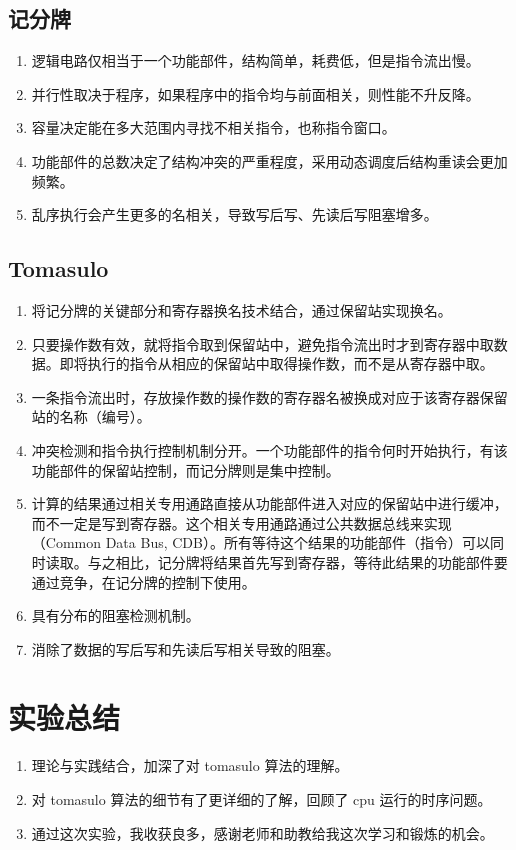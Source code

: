 \documentclass{article}
\begin{document}
\subsection{记分牌}




\begin{enumerate}
\item
逻辑电路仅相当于一个功能部件，结构简单，耗费低，但是指令流出慢。
\item
并行性取决于程序，如果程序中的指令均与前面相关，则性能不升反降。
\item
容量决定能在多大范围内寻找不相关指令，也称指令窗口。
\item
功能部件的总数决定了结构冲突的严重程度，采用动态调度后结构重读会更加频繁。
\item
乱序执行会产生更多的名相关，导致写后写、先读后写阻塞增多。
\end{enumerate}



\subsection{Tomasulo}




\begin{enumerate}
\item
将记分牌的关键部分和寄存器换名技术结合，通过保留站实现换名。
\item
只要操作数有效，就将指令取到保留站中，避免指令流出时才到寄存器中取数据。即将执行的指令从相应的保留站中取得操作数，而不是从寄存器中取。
\item
一条指令流出时，存放操作数的操作数的寄存器名被换成对应于该寄存器保留站的名称（编号）。
\item
冲突检测和指令执行控制机制分开。一个功能部件的指令何时开始执行，有该功能部件的保留站控制，而记分牌则是集中控制。
\item
计算的结果通过相关专用通路直接从功能部件进入对应的保留站中进行缓冲，而不一定是写到寄存器。这个相关专用通路通过公共数据总线来实现（Common Data Bus, CDB）。所有等待这个结果的功能部件（指令）可以同时读取。与之相比，记分牌将结果首先写到寄存器，等待此结果的功能部件要通过竞争，在记分牌的控制下使用。
\item
具有分布的阻塞检测机制。
\item
消除了数据的写后写和先读后写相关导致的阻塞。
\end{enumerate}



\section{实验总结}




\begin{enumerate}
\item
理论与实践结合，加深了对 tomasulo 算法的理解。
\item
对 tomasulo 算法的细节有了更详细的了解，回顾了 cpu 运行的时序问题。
\item
通过这次实验，我收获良多，感谢老师和助教给我这次学习和锻炼的机会。
\end{enumerate}
\end{document}
